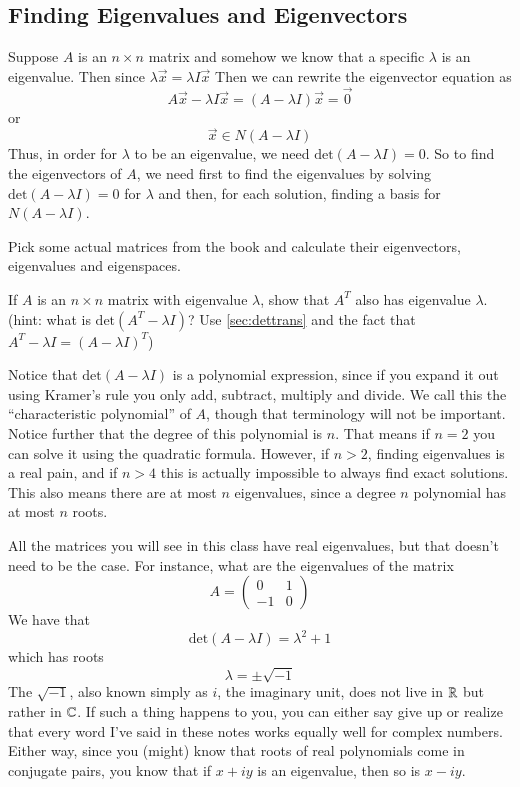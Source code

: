 \documentclass[Main.tex]{subfiles}
\begin{document}
\subsection{Finding Eigenvalues and Eigenvectors}

Suppose $A$ is an $n\times n$ matrix and somehow we know that a specific $\lambda$ is an eigenvalue.
Then since $\lambda\vec{x}=\lambda I \vec{x}$
Then we can rewrite the eigenvector equation as
\[A\vec{x}-\lambda I\vec{x} = (A-\lambda I)\vec{x} = \vec{0}\]
or
\[\vec{x}\in N(A-\lambda I)\]
Thus, in order for $\lambda$ to be an eigenvalue, we need $\mbox{det}(A-\lambda I)=0$.
So to find the eigenvectors of $A$, we need first to find the eigenvalues by solving $\mbox{det}(A-\lambda I)=0$ for $\lambda$ and then, for each solution, finding a basis for $N(A-\lambda I)$.  

\begin{ImpEx}
  Pick some actual matrices from the book and calculate their eigenvectors, eigenvalues and eigenspaces.
\end{ImpEx}

\begin{Ex}
  \label{sec:eigentrans}
  If $A$ is an $n\times n$ matrix with eigenvalue $\lambda$, show that $A^T$ also has eigenvalue $\lambda$. 
  (hint: what is $\mbox{det}(A^T-\lambda I)$?  Use \ref{sec:dettrans} and the fact that $A^T-\lambda I=(A-\lambda I)^T$)
\end{Ex}

Notice that $\mbox{det}(A-\lambda I)$ is a polynomial expression, since if you expand it out using Kramer's rule you only add, subtract, multiply and divide.
We call this the ``characteristic polynomial'' of $A$, though that terminology will not be important.  
Notice further that the degree of this polynomial is $n$.
That means if $n=2$ you can solve it using the quadratic formula.
However, if $n>2$, finding eigenvalues is a real pain, and if $n>4$ this is actually impossible to always find exact solutions.  
This also means there are at most $n$ eigenvalues, since a degree $n$ polynomial has at most $n$ roots.  

\begin{Warning}
  All the matrices you will see in this class have real eigenvalues, but that doesn't need to be the case.
  For instance, what are the eigenvalues of the matrix
  \[A=\left(\begin{array}{cc} 0 & 1 \\ -1 & 0\end{array}\right)\]
  We have that
  \[\mbox{det}(A-\lambda I) = \lambda^2 + 1\]
  which has roots
  \[\lambda = \pm \sqrt{-1}\]
  The $\sqrt{-1}$, also known simply as $i$, the imaginary unit, does not live in $\mathbb{R}$ but rather in $\mathbb{C}$.
  If such a thing happens to you, you can either say give up or realize that every word I've said in these notes works equally well for complex numbers.
  Either way, since you (might) know that roots of real polynomials come in conjugate pairs, you know that if $x+iy$ is an eigenvalue, then so is $x-iy$.  
\end{Warning}
\end{document}
